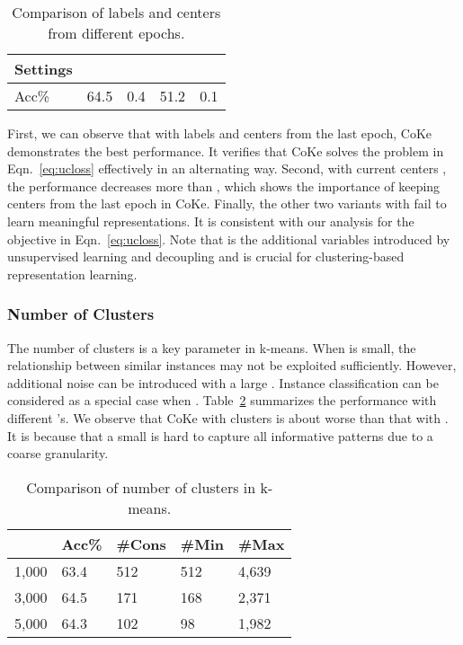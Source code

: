 \documentclass[10pt,twocolumn,letterpaper]{article}
\begin{document}
\begin{table}[!ht]
\centering
\scriptsize
\begin{tabular}{|l|c|c|c|c|}\hline
Settings&&&&\\\hline
Acc\% &64.5&0.4& 51.2&0.1\\\hline
\end{tabular}
\caption{Comparison of labels and centers from different epochs.}\label{ta:lc}
\end{table}

First, we can observe that with labels and centers from the last epoch, CoKe demonstrates the best performance. It verifies that CoKe solves the problem in Eqn.~\ref{eq:ucloss} effectively in an alternating way. Second, with current centers , the performance decreases more than , which shows the importance of keeping centers from the last epoch in CoKe. Finally, the other two variants with  fail to learn meaningful representations. It is consistent with our analysis for the objective in Eqn.~\ref{eq:ucloss}. Note that  is the additional variables introduced by unsupervised learning and decoupling  and  is crucial for clustering-based representation learning.



\subsubsection{Number of Clusters}
The number of clusters is a key parameter in k-means. When  is small, the relationship between similar instances may not be exploited sufficiently. However, additional noise can be introduced with a large . Instance classification can be considered as a special case when . Table~\ref{ta:k} summarizes the performance with different 's. We observe that CoKe with  clusters is about  worse than that with . It is because that a small  is hard to capture all informative patterns due to a coarse granularity. 

\begin{table}[!ht]
\centering
\begin{tabular}{|l|l|l|l|l|}\hline
&Acc\%&\#Cons&\#Min&\#Max\\\hline
1,000&63.4&512&512&4,639\\\hline
3,000&64.5&171&168&2,371\\\hline
5,000&64.3&102&98&1,982\\\hline
\end{tabular}
\caption{Comparison of number of clusters  in k-means.}\label{ta:k}
\end{table}
\end{document}
